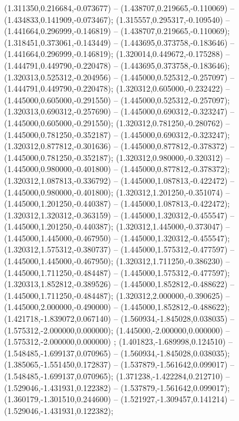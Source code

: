  (1.311350,0.216684,-0.073677) -- (1.438707,0.219665,-0.110069) -- (1.434833,0.141909,-0.073467);
 (1.315557,0.295317,-0.109540) -- (1.441664,0.296999,-0.146819) -- (1.438707,0.219665,-0.110069);
 (1.318451,0.373061,-0.143449) -- (1.443695,0.373758,-0.183646) -- (1.441664,0.296999,-0.146819);
 (1.320014,0.449672,-0.175288) -- (1.444791,0.449790,-0.220478) -- (1.443695,0.373758,-0.183646);
 (1.320313,0.525312,-0.204956) -- (1.445000,0.525312,-0.257097) -- (1.444791,0.449790,-0.220478);
 (1.320312,0.605000,-0.232422) -- (1.445000,0.605000,-0.291550) -- (1.445000,0.525312,-0.257097);
 (1.320313,0.690312,-0.257690) -- (1.445000,0.690312,-0.323247) -- (1.445000,0.605000,-0.291550);
 (1.320312,0.781250,-0.280762) -- (1.445000,0.781250,-0.352187) -- (1.445000,0.690312,-0.323247);
 (1.320312,0.877812,-0.301636) -- (1.445000,0.877812,-0.378372) -- (1.445000,0.781250,-0.352187);
 (1.320312,0.980000,-0.320312) -- (1.445000,0.980000,-0.401800) -- (1.445000,0.877812,-0.378372);
 (1.320312,1.087813,-0.336792) -- (1.445000,1.087813,-0.422472) -- (1.445000,0.980000,-0.401800);
 (1.320312,1.201250,-0.351074) -- (1.445000,1.201250,-0.440387) -- (1.445000,1.087813,-0.422472);
 (1.320312,1.320312,-0.363159) -- (1.445000,1.320312,-0.455547) -- (1.445000,1.201250,-0.440387);
 (1.320312,1.445000,-0.373047) -- (1.445000,1.445000,-0.467950) -- (1.445000,1.320312,-0.455547);
 (1.320312,1.575312,-0.380737) -- (1.445000,1.575312,-0.477597) -- (1.445000,1.445000,-0.467950);
 (1.320312,1.711250,-0.386230) -- (1.445000,1.711250,-0.484487) -- (1.445000,1.575312,-0.477597);
 (1.320313,1.852812,-0.389526) -- (1.445000,1.852812,-0.488622) -- (1.445000,1.711250,-0.484487);
 (1.320312,2.000000,-0.390625) -- (1.445000,2.000000,-0.490000) -- (1.445000,1.852812,-0.488622);
 (1.421718,-1.839072,0.067140) -- (1.560934,-1.845028,0.038035) -- (1.575312,-2.000000,0.000000);
 (1.445000,-2.000000,0.000000) -- (1.575312,-2.000000,0.000000) ;
 (1.401823,-1.689998,0.124510) -- (1.548485,-1.699137,0.070965) -- (1.560934,-1.845028,0.038035);
 (1.385065,-1.551450,0.172837) -- (1.537879,-1.561642,0.099017) -- (1.548485,-1.699137,0.070965);
 (1.371238,-1.422284,0.212710) -- (1.529046,-1.431931,0.122382) -- (1.537879,-1.561642,0.099017);
 (1.360179,-1.301510,0.244600) -- (1.521927,-1.309457,0.141214) -- (1.529046,-1.431931,0.122382);
